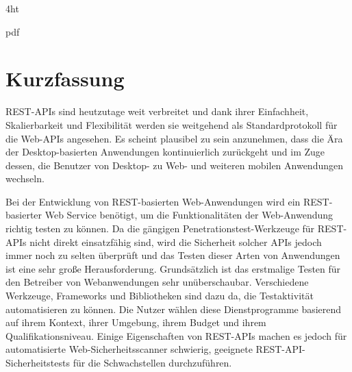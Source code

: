 \documentclass[
               fontsize=13pt,
               paper=a4,
               twoside,  %
               bibliography=totoc,
               headsepline,
               cleardoublepage=empty,
               parskip=half,
               final
               ]{scrbook}
\begin{document}
\iftex4ht
\Configure{$}{\PicMath}{\EndPicMath}{} 

         {pdf}  
         {%
         }  
\fi

%
%




\Titelblatt

\pagestyle{preamble}
\renewcommand*{\chapterpagestyle}{preamble}



\ifdeutsch
\section*{Kurzfassung}

REST-APIs sind heutzutage weit verbreitet und dank ihrer Einfachheit, Skalierbarkeit und Flexibilität werden sie weitgehend als Standardprotokoll für die Web-APIs angesehen. Es scheint plausibel zu sein anzunehmen, dass die Ära der Desktop-basierten Anwendungen kontinuierlich zurückgeht und im Zuge dessen, die Benutzer von Desktop- zu Web- und weiteren mobilen Anwendungen wechseln.

Bei der Entwicklung von REST-basierten Web-Anwendungen wird ein REST-basierter Web Service benötigt, um die Funktionalitäten der Web-Anwendung richtig testen zu können. Da die gängigen Penetrationstest-Werkzeuge für REST-APIs nicht direkt einsatzfähig sind, wird die Sicherheit solcher APIs jedoch immer noch zu selten überprüft und das Testen dieser Arten von Anwendungen ist eine sehr große Herausforderung. Grundsätzlich ist das erstmalige Testen für den Betreiber von Webanwendungen sehr unüberschaubar. Verschiedene Werkzeuge, Frameworks und Bibliotheken sind dazu da, die Testaktivität automatisieren zu können. Die Nutzer wählen diese Dienstprogramme basierend auf ihrem Kontext, ihrer Umgebung, ihrem Budget und ihrem Qualifikationsniveau. Einige Eigenschaften von REST-APIs machen es jedoch für automatisierte Web-Sicherheitsscanner schwierig, geeignete REST-API-Sicherheitstests für die Schwachstellen durchzuführen.
\end{document}
